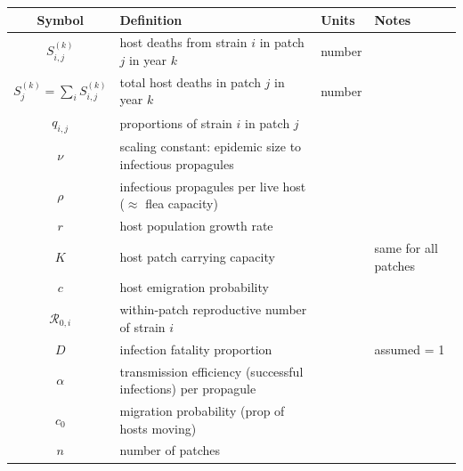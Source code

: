 \begin{table}
  \begin{tabular}{|c|p{2in}|l|p{2in}|}
    \hline
    Symbol & Definition & Units & Notes \\
    \hline
    $S_{i,j}^{(k)}$ & host deaths from strain $i$ in patch $j$ in year $k$ & number & \\
    $S_j^{(k)} = \sum_i S_{i,j}^{(k)}$ & total host deaths in patch $j$ in year $k$ & number & \\
    $q_{i,j}$ & proportions of strain $i$ in patch $j$ & &  \\
    $\nu$ & scaling constant: epidemic size to infectious propagules & & \\
    $\rho$ & infectious propagules per live host ($\approx$ flea capacity) & & \\
    $r$ & host population growth rate & & \\
    $K$ & host patch carrying capacity & & same for all patches \\
    $c$ & host emigration probability & & \\
    $\mathcal{R}_{0,i}$ & within-patch reproductive number of strain $i$ & &  \\
    $D$ & infection fatality proportion & & assumed = 1 \\
    $\alpha$ &  transmission efficiency (successful infections) per propagule & & \\
    $c_0$ & migration probability (prop of hosts moving) & &  \\
    $n$ & number of patches & & 
    \hline
  \end{tabular}
\end{table}

